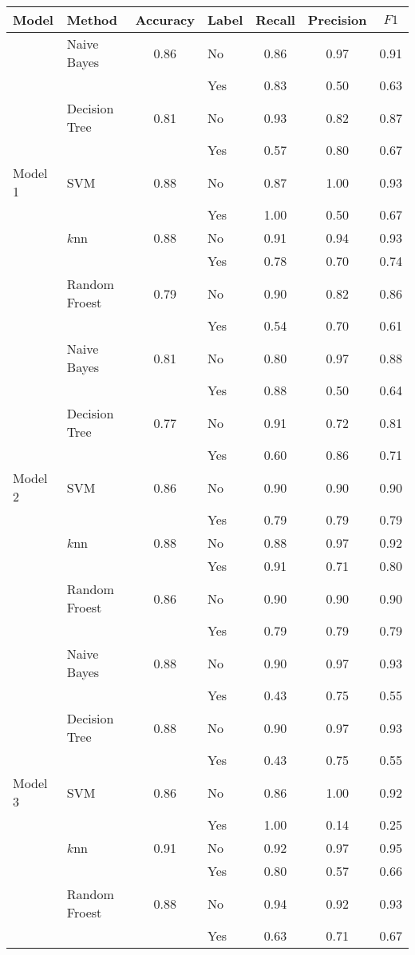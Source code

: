\documentclass{article}
\begin{document}
\begin{table}
	\centering
	\begin{tabular}{|l|l|c|l|c|c|c|}\hline
		Model&Method&Accuracy&Label&Recall&Precision&$F1$\\\hline
						&Naive Bayes	&0.86	&No		&0.86	&0.97	&0.91\\\cline{4-7}
						&				&		&Yes	&0.83	&0.50	&0.63\\\cline{2-7}
						&Decision Tree 	&0.81  	&No		&0.93	&0.82	&0.87\\\cline{4-7}
						&				&		&Yes	&0.57	&0.80	&0.67\\\cline{2-7}
		Model 1			&SVM			&0.88	&No		&0.87	&1.00	&0.93\\\cline{4-7}
						&				&		&Yes	&1.00	&0.50	&0.67\\\cline{2-7}
						&$k$nn			&0.88	&No		&0.91	&0.94	&0.93\\\cline{4-7}
						&				&		&Yes	&0.78	&0.70	&0.74\\\cline{2-7}						
						&Random Froest	&0.79	&No		&0.90	&0.82	&0.86\\\cline{4-7}
						&				&		&Yes	&0.54	&0.70	&0.61\\\hline
						&Naive Bayes	&0.81	&No		&0.80	&0.97	&0.88\\\cline{4-7}
						&				&		&Yes	&0.88	&0.50	&0.64\\\cline{2-7}
						&Decision Tree 	&0.77  	&No		&0.91	&0.72	&0.81\\\cline{4-7}
						&				&		&Yes	&0.60	&0.86	&0.71\\\cline{2-7}
		Model 2			&SVM			&0.86	&No		&0.90	&0.90	&0.90\\\cline{4-7}
						&				&		&Yes	&0.79	&0.79	&0.79\\\cline{2-7}
						&$k$nn			&0.88	&No		&0.88	&0.97	&0.92\\\cline{4-7}
						&				&		&Yes	&0.91	&0.71	&0.80\\\cline{2-7}						
						&Random Froest	&0.86	&No		&0.90	&0.90	&0.90\\\cline{4-7}
						&				&		&Yes	&0.79	&0.79	&0.79\\\hline						
						&Naive Bayes	&0.88	&No		&0.90	&0.97	&0.93\\\cline{4-7}
						&				&		&Yes	&0.43	&0.75	&0.55\\\cline{2-7}
						&Decision Tree 	&0.88  	&No		&0.90	&0.97	&0.93\\\cline{4-7}
						&				&		&Yes	&0.43	&0.75	&0.55\\\cline{2-7}
		Model 3			&SVM			&0.86	&No		&0.86	&1.00	&0.92\\\cline{4-7}
						&				&		&Yes	&1.00	&0.14	&0.25\\\cline{2-7}
						&$k$nn			&0.91	&No		&0.92	&0.97	&0.95\\\cline{4-7}
						&				&		&Yes	&0.80	&0.57	&0.66\\\cline{2-7}						
						&Random Froest	&0.88	&No		&0.94	&0.92	&0.93\\\cline{4-7}
						&				&		&Yes	&0.63	&0.71	&0.67\\\hline				
	\end{tabular}
\end{table}
		
\end{document}

